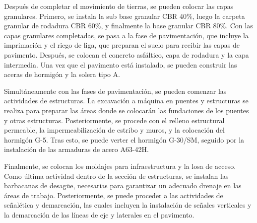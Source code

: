\documentclass{article} %
\begin{document}
Después de completar el movimiento de tierras, se pueden colocar las capas granulares. Primero, se instala la sub base granular CBR 40\%, luego la carpeta granular de rodadura CBR 60\%, y finalmente la base granular CBR 80\%. Con las capas granulares completadas, se pasa a la fase de pavimentación, que incluye la imprimación y el riego de liga, que preparan el suelo para recibir las capas de pavimento. Después, se colocan el concreto asfáltico, capa de rodadura y la capa intermedia. Una vez que el pavimento está instalado, se pueden construir las aceras de hormigón y la solera tipo A.

Simultáneamente con las fases de pavimentación, se pueden comenzar las actividades de estructuras. La excavación a máquina en puentes y estructuras se realiza para preparar las áreas donde se colocarán las fundaciones de los puentes y otras estructuras. Posteriormente, se procede con el relleno estructural permeable, la impermeabilización de estribo y muros, y la colocación del hormigón G-5. Tras esto, se puede verter el hormigón G-30/SM, seguido por la instalación de las armaduras de acero A63-42H.

Finalmente, se colocan los moldajes para infraestructura y la losa de acceso. Como última actividad dentro de la sección de estructuras, se instalan las barbacanas de desagüe, necesarias para garantizar un adecuado drenaje en las áreas de trabajo. Posteriormente, se puede proceder a las actividades de señalética y demarcación, las cuales incluyen la instalación de señales verticales y la demarcación de las líneas de eje y laterales en el pavimento.
\end{document}
